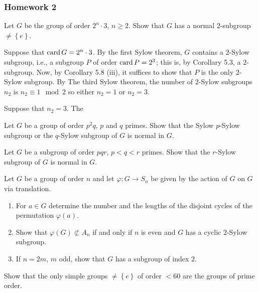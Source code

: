 \subsubsection{Homework 2}
\setcounter{exercise}{0}
\setcounter{equation}{0}

\begin{problem}
  Let $G$ be the group of order $2^n\cdot 3$, $n\geq 2$. Show that $G$ has
  a normal $2$-subgroup $\neq\left\{e\right\}$.
\end{problem}
\begin{solution}
  Suppose that $\operatorname{card} G=2^n\cdot 3$. By the first Sylow theorem, $G$
  contains a $2$-Sylow subgroup, i.e., a subgroup $P$ of order
  $\operatorname{card} P=2^3$; this is, by Corollary 5.3, a $2$-subgroup. Now, by
  Corollary 5.8 (iii), it suffices to show that $P$ is the only $2$-Sylow
  subgroup. By The third Sylow theorem, the number of $2$-Sylow subgroups
  $n_2$ is $n_2\equiv 1\mod 2$ so either $n_2=1$ or $n_2=3$.

  Suppose that $n_2=3$. The
\end{solution}

\begin{problem}
  Let $G$ be a group of order $p^2q$, $p$ and $q$ primes. Show that the
  Sylow $p$-Sylow subgroup or the $q$-Sylow subgroup of $G$ is normal in
  $G$.
\end{problem}
\begin{solution}
\end{solution}

\begin{problem}
  Let $G$ be a subgroup of order $pqr$, $p<q<r$ primes. Show that the
  $r$-Sylow subgroup of $G$ is normal in $G$.
\end{problem}
\begin{solution}
\end{solution}

\begin{problem}
  Let $G$ be a group of order $n$ and let $\varphi\colon G\to S_n$ be given
  by the action of $G$ on $G$ via translation.
  \begin{enumerate}[label=(\alph*),noitemsep]
  \item For $a\in G$ determine the number and the lengths of the disjoint
    cycles of the permutation $\varphi(a)$.
  \item Show that $\varphi(G)\nsubset A_n$ if and only if $n$ is even and
    $G$ has a cyclic $2$-Sylow subgroup.
  \item If $n=2m$, $m$ odd, show that $G$ has a subgroup of index $2$.
  \end{enumerate}
\end{problem}
\begin{solution}
\end{solution}

\begin{problem}
  Show that the only simple groups $\neq\left\{e\right\}$ of order $<60$
  are the groups of prime order.
\end{problem}
\begin{solution}
\end{solution}


